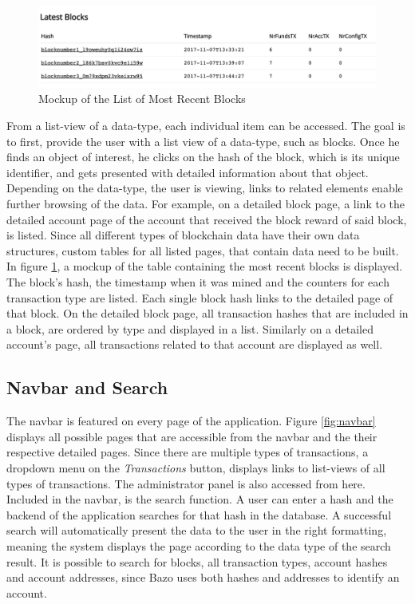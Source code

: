 \begin{figure}
  \includegraphics[width=\linewidth]{mockup1.png}
  \centering
  \caption{Mockup of the List of Most Recent Blocks}
  \label{fig:mockup1}
\end{figure}

From a list-view of a data-type, each individual item can be accessed. The goal is to first, provide the user with a list view of a data-type, such as blocks. Once he finds an object of interest, he clicks on the hash of the block, which is its unique identifier, and gets presented with detailed information about that object. Depending on the data-type, the user is viewing, links to related elements enable further browsing of the data. For example, on a detailed block page, a link to the detailed account page of the account that received the block reward of said block, is listed. Since all different types of blockchain data have their own data structures, custom tables for all listed pages, that contain data need to be built. In figure \ref{fig:mockup1}, a mockup of the table containing the most recent blocks is displayed. The block's hash, the timestamp when it was mined and the counters for each transaction type are listed. Each single block hash links to the detailed page of that block. On the detailed block page, all transaction hashes that are included in a block, are ordered by type and displayed in a list. Similarly on a detailed account's page, all transactions related to that account are displayed as well.

\subsection{Navbar and Search}
The navbar is featured on every page of the application. Figure \ref{fig:navbar} displays all possible pages that are accessible from the navbar and the their respective detailed pages. Since there are multiple types of transactions, a dropdown menu on the \emph{Transactions} button, displays links to list-views of all types of transactions. The administrator panel is also accessed from here. Included in the navbar, is the search function. A user can enter a hash and the backend of the application searches for that hash in the database. A successful search will automatically present the data to the user in the right formatting, meaning the system displays the page according to the data type of the search result. It is possible to search for blocks, all transaction types, account hashes and account addresses, since Bazo uses both hashes and addresses to identify an account.

